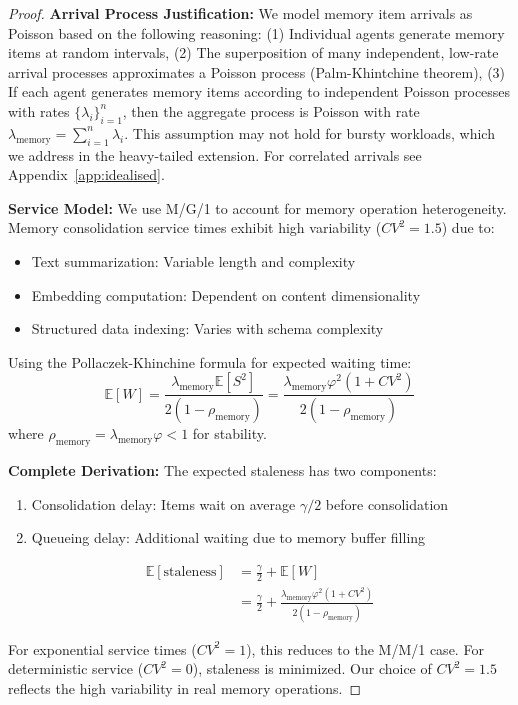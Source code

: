 \documentclass{article}
\begin{document}
\begin{proof}
\textbf{Arrival Process Justification:} We model memory item arrivals as Poisson based on the following reasoning: (1) Individual agents generate memory items at random intervals, (2) The superposition of many independent, low-rate arrival processes approximates a Poisson process (Palm-Khintchine theorem), (3) If each agent generates memory items according to independent Poisson processes with rates $\{\lambda_i\}_{i=1}^n$, then the aggregate process is Poisson with rate $\lambda_{\text{memory}} = \sum_{i=1}^n \lambda_i$. This assumption may not hold for bursty workloads, which we address in the heavy-tailed extension. For correlated arrivals see Appendix~\ref{app:idealised}.

\textbf{Service Model:} We use M/G/1 to account for memory operation heterogeneity. Memory consolidation service times exhibit high variability ($CV^2 = 1.5$) due to:
\begin{itemize}
\item Text summarization: Variable length and complexity
\item Embedding computation: Dependent on content dimensionality  
\item Structured data indexing: Varies with schema complexity
\end{itemize}

Using the Pollaczek-Khinchine formula for expected waiting time:
\begin{equation}
\mathbb{E}[W] = \frac{\lambda_{\text{memory}}\mathbb{E}[S^2]}{2(1-\rho_{\text{memory}})} = \frac{\lambda_{\text{memory}}\varphi^2(1+CV^2)}{2(1-\rho_{\text{memory}})}
\end{equation}
where $\rho_{\text{memory}} = \lambda_{\text{memory}}\varphi < 1$ for stability.

\textbf{Complete Derivation:} The expected staleness has two components:
\begin{enumerate}
\item Consolidation delay: Items wait on average $\gamma/2$ before consolidation
\item Queueing delay: Additional waiting due to memory buffer filling
\end{enumerate}

\begin{align}
\mathbb{E}[\text{staleness}] &= \frac{\gamma}{2} + \mathbb{E}[W] \\
&= \frac{\gamma}{2} + \frac{\lambda_{\text{memory}}\varphi^2(1+CV^2)}{2(1-\rho_{\text{memory}})}
\end{align}

For exponential service times ($CV^2 = 1$), this reduces to the M/M/1 case. For deterministic service ($CV^2 = 0$), staleness is minimized. Our choice of $CV^2 = 1.5$ reflects the high variability in real memory operations.
\end{proof}
\end{document}
